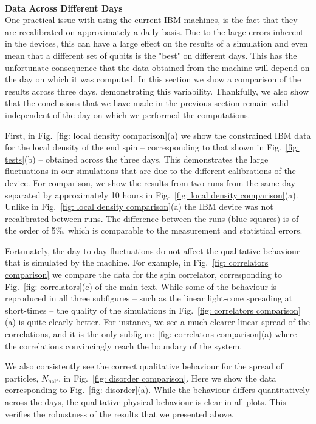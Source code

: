 \documentclass[twocolumn,showpacs,preprintnumbers,nofootinbib,amsmath,aps,pra,longbibliography,amssymb,superscriptaddress]{revtex4-1}
\begin{document}
\hfill\\\textbf{Data Across Different Days}\\
One practical issue with using the current IBM machines, is the fact that they are recalibrated on approximately a daily basis. Due to the large errors inherent in the devices, this can have a large effect on the results of a simulation and even mean that a different set of qubits is the "best" on different days. This has the unfortunate consequence that the data obtained from the machine will depend on the day on which it was computed. In this section we show a comparison of the results across three days, demonstrating this variability. Thankfully, we also show that the conclusions that we have made in the previous section remain valid independent of the day on which we performed the computations.


First, in Fig.~\ref{fig: local density comparison}(a) we show the constrained IBM data for the local density of the end spin -- corresponding to that shown in Fig.~\ref{fig: tests}(b) -- obtained across the three days. This demonstrates the large fluctuations in our simulations that are due to the different calibrations of the device. For comparison, we show the results from two runs from the same day separated by approximately 10 hours in Fig.~\ref{fig: local density comparison}(a). Unlike in Fig.~\ref{fig: local density comparison}(a) the IBM device was not recalibrated between runs. The difference between the runs (blue squares) is of the order of 5\%, which is comparable to the measurement and statistical errors. 


Fortunately, the day-to-day fluctuations do not affect the qualitative behaviour that is simulated by the machine. For example, in Fig.~\ref{fig: correlators comparison} we compare the data for the spin correlator, corresponding to Fig.~\ref{fig: correlators}(c) of the main text. While some of the behaviour is reproduced in all three subfigures -- such as the linear light-cone spreading at short-times -- the quality of the simulations in Fig.~\ref{fig: correlators comparison}(a) is quite clearly better. For instance, we see a much clearer linear spread of the correlations, and it is the only subfigure~\ref{fig: correlators comparison}(a) where the correlations convincingly reach the boundary of the system.


We also consistently see the correct qualitative behaviour for the spread of particles, $N_\text{half}$, in Fig.~\ref{fig: disorder comparison}. Here we show the data corresponding to Fig.~\ref{fig: disorder}(a). While the behaviour differs quantitatively across the days, the qualitative physical behaviour is clear in all plots. This verifies the robustness of the results that we presented above.
\end{document}
